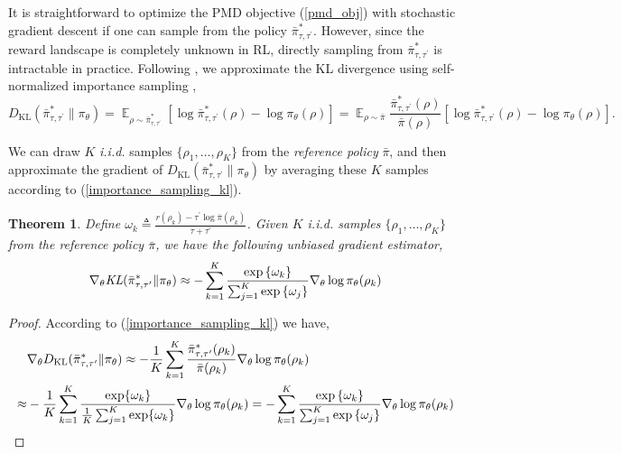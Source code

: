 \documentclass{article}
\DeclareMathOperator*\ep{\mathbb{E}}
\newcommand*{\refPi}{\bar{\pi}}
\newcommand{\KL}{D_{\text{KL}}}
\newtheorem{thm}{Theorem}
\begin{document}
It is straightforward to optimize the PMD objective (\ref{pmd_obj}) with stochastic gradient descent if one can sample from the policy $\bar{\pi}_{\tau,\tau^{\prime}}^*$. However, since the reward landscape is completely unknown in RL, directly sampling from $\bar{\pi}_{\tau,\tau^{\prime}}^*$ is intractable in practice. Following \cite{nachum2017improving}, we approximate the KL divergence using self-normalized importance sampling \cite{owen2013monte},
\begin{equation}
\label{importance_sampling_kl}
\KL(\bar{\pi}_{\tau,\tau^{\prime}}^* \| \pi_\theta) = \ep_{\rho \sim \bar{\pi}_{\tau,\tau^{\prime}}^* } \left[ \log \bar{\pi}_{\tau,\tau^{\prime}}^*(\rho) - \log \pi_\theta(\rho) \right] = \ep_{\rho\sim \refPi} \frac{\bar{\pi}_{\tau,\tau^{\prime}}^*(\rho)}{\refPi(\rho)} \left[ \log \bar{\pi}_{\tau,\tau^{\prime}}^*(\rho) - \log \pi_\theta(\rho) \right].
\end{equation}

We can draw $K$ \textit{i.i.d.} samples $\{\rho_1, \dots, \rho_K\}$ from the \emph{reference policy} $\refPi$, and then approximate the gradient of $\KL(\bar{\pi}_{\tau,\tau^{\prime}}^* \| \pi_\theta)$ by averaging these $K$ samples according to (\ref{importance_sampling_kl}). 

\begin{thm}
Define $\omega_k \triangleq \frac{r(\rho_k) - \tau^{\prime} \log{\refPi(\rho_k)} }{\tau + \tau^{\prime}}$. Given $K$ \emph{i.i.d.} samples $\{\rho_1, \dots, \rho_K\}$ from the \emph{reference policy} $\refPi$, we have the following unbiased gradient estimator,
\begin{equation}
\label{gradient_estimator}
\nabla_{\theta} \text{\em KL}(\bar{\pi}_{\tau,\tau^{\prime}}^* \| \pi_\theta)\approx -\sum\limits_{k=1}^K{ \frac{ \exp\left\{ \omega_k \right\} }{ \sum_{j=1}^K{ \exp\left\{ \omega_j \right\}}} \nabla_{\theta} \log{\pi_\theta(\rho_k)} }
\end{equation}
\end{thm}
\begin{proof}
According to (\ref{importance_sampling_kl}) we have,
\begin{equation}
\begin{split}
&\nabla_{\theta} \KL(\bar{\pi}_{\tau,\tau^{\prime}}^* \| \pi_\theta) \approx -\frac{1}{K}\sum_{k=1}^K \frac{\bar{\pi}_{\tau,\tau^{\prime}}^* (\rho_k)}{\refPi(\rho_k)} \nabla_{\theta} \log \pi_\theta(\rho_k) \\ 
\approx & -\frac{1}{K}\sum_{k=1}^K \frac{\exp \{\omega_k\}} {\frac{1}{K} \sum_{j=1}^K \exp \{\omega_k\}} \nabla_{\theta} \log \pi_\theta(\rho_k) =  -\sum\limits_{k=1}^K{ \frac{ \exp\left\{ \omega_k \right\} }{ \sum_{j=1}^K{ \exp\left\{ \omega_j \right\}}} \nabla_{\theta} \log{\pi_\theta(\rho_k)} } \qedhere
\end{split}
\end{equation}
\end{proof}
\end{document}
